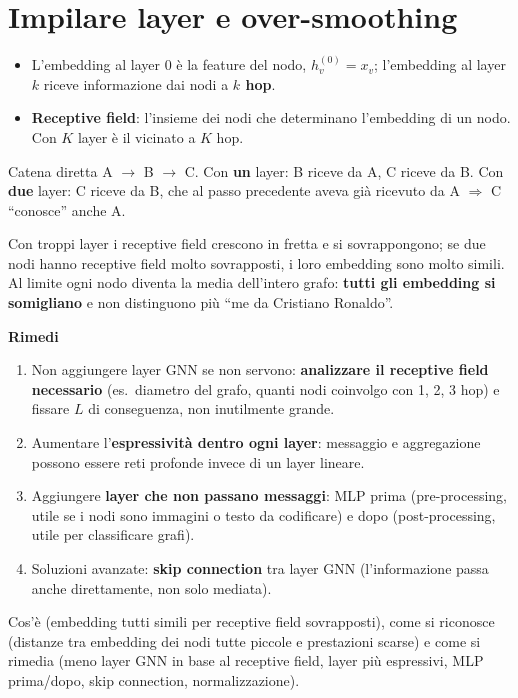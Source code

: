 \section{Impilare layer e over-smoothing}
\begin{itemize}
  \item L'embedding al layer 0 è la feature del nodo, $h_v^{(0)} = x_v$; l'embedding al layer $k$ riceve informazione dai nodi a
        \textbf{$k$ hop}.
  \item \textbf{Receptive field}: l'insieme dei nodi che determinano l'embedding di un nodo. Con $K$ layer è il vicinato a $K$ hop.
\end{itemize}
\begin{esempio}[perché più layer = più vicini]
Catena diretta A $\to$ B $\to$ C. Con \textbf{un} layer: B riceve da A, C riceve da B. Con \textbf{due} layer: C riceve da B, che al passo
precedente aveva già ricevuto da A $\Rightarrow$ C ``conosce'' anche A.
\end{esempio}
\begin{definizione}
Con troppi layer i receptive field crescono in fretta e si sovrappongono; se due nodi hanno receptive field molto sovrapposti, i loro
embedding sono molto simili. Al limite ogni nodo diventa la media dell'intero grafo: \textbf{tutti gli embedding si somigliano} e non
distinguono più ``me da Cristiano Ronaldo''.
\end{definizione}
\textbf{Rimedi}
\begin{enumerate}
  \item Non aggiungere layer GNN se non servono: \textbf{analizzare il receptive field necessario} (es.\ diametro del grafo, quanti nodi coinvolgo
        con 1, 2, 3 hop) e fissare $L$ di conseguenza, non inutilmente grande.
  \item Aumentare l'\textbf{espressività dentro ogni layer}: messaggio e aggregazione possono essere reti profonde invece di un layer lineare.
  \item Aggiungere \textbf{layer che non passano messaggi}: MLP prima (pre-processing, utile se i nodi sono immagini o testo da codificare)
        e dopo (post-processing, utile per classificare grafi).
  \item Soluzioni avanzate: \textbf{skip connection} tra layer GNN (l'informazione passa anche direttamente, non solo mediata).
\end{enumerate}
\begin{esame}
Cos'è (embedding tutti simili per receptive field sovrapposti), come si riconosce (distanze tra embedding dei nodi tutte piccole e
prestazioni scarse) e come si rimedia (meno layer GNN in base al receptive field, layer più espressivi, MLP prima/dopo, skip
connection, normalizzazione).
\end{esame}


